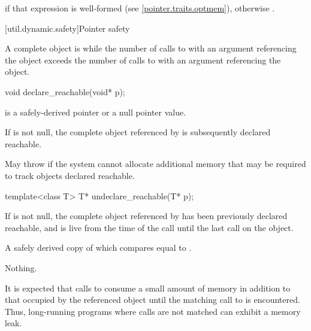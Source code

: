 \begin{itemdescr}
\pnum
\returns
{} if that expression is well-formed
(see \ref{pointer.traits.optmem}),
otherwise .
\end{itemdescr}

[util.dynamic.safety]{Pointer safety}

\pnum
A complete object is  while the number of calls to
 with an argument referencing the object exceeds the
number of calls to  with an argument referencing the
object.

%
\begin{itemdecl}
void declare_reachable(void* p);
\end{itemdecl}

\begin{itemdescr}
\pnum
\expects
{} is a safely-derived pointer
or a null pointer value.

\pnum
\effects
If  is not null, the complete object referenced by 
is subsequently declared reachable.

\pnum
\throws
May throw  if the system cannot allocate
additional memory that may be required to track objects declared reachable.
\end{itemdescr}

%
\begin{itemdecl}
template<class T> T* undeclare_reachable(T* p);
\end{itemdecl}

\begin{itemdescr}
\pnum
\expects
If  is not null, the complete object referenced by 
has been previously declared reachable, and is
live from the time of the call until the last
 call on the object.

\pnum
\returns
A safely derived copy of  which compares equal to .

\pnum
\throws
Nothing.

\pnum
\begin{note}
It is expected that calls to  consume
a small amount of memory in addition to that occupied by the referenced object until the
matching call to  is encountered.
Thus, long-running programs where calls are not matched can exhibit a memory leak.
\end{note}
\end{itemdescr}

